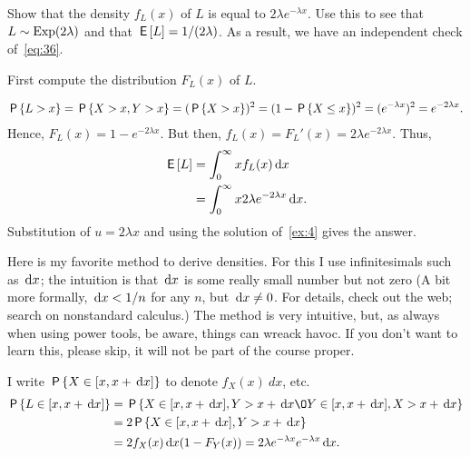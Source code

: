 \documentclass[a4paper,12pt]{article}
\begin{document}
\begin{exercise}
Show that the density $f_{L}(x)$ of $L$ is equal to $2\lambda e^{-\lambda x}$. Use this to see that $L\sim \mathrm{Exp}(2\lambda)$ and that $\,\mathsf{E}\left[L\right] = 1/(2\lambda)$. As a result, we have an independent check of~\cref{eq:36}.
\begin{hint}
  First compute the distribution $F_L(x)$ of $L$.
\end{hint}
\begin{solution}
  \begin{align}
    \label{eq:22}
\P{L>x}  = \P{X>x, Y> x} = (\P{X>x})^2 = (1-\P{X\leq x})^2= (e^{-\lambda x})^2 = e^{-2\lambda x}.
  \end{align}
Hence, $F_{L}(x) = 1-e^{-2 \lambda x}$. But then, $f_L(x) = F_L'(x) = 2 \lambda e^{-2\lambda x}$. Thus, 
  \begin{align}
\,\mathsf{E}\left[L\right]
&= \int_{0}^{\infty}  x f_{L}(x) \,\textrm{d}x  \\
&= \int_{0}^{\infty}  x 2 \lambda e^{-2\lambda x} \,\textrm{d}x.
  \end{align}
Substitution of $u=2\lambda x$ and using the solution of~\cref{ex:4} gives the answer.

Here is my favorite method to derive densities. For this I use infinitesimals such as $\,\textrm{d}x$; the intuition is that $\,\textrm{d}x$ is some really small number but not zero (A bit more formally, $\,\textrm{d}x < 1/n$ for any $n$, but $\,\textrm{d}x \neq 0$. For details, check out the web; search on nonstandard calculus.) The method is very intuitive, but, as always when using power tools, be aware, things can wreack havoc. If you don't want to learn this, please skip, it will not be part of the course proper.

I write $\,\mathsf{P}\left\{X\in [x, x+\,\textrm{d}x]\right\}$ to denote $f_{X}(x)\ dx$, etc. 
\begin{align}
  \label{eq:24}
\P{L\in [x, x+\d x]}  
&= \P{X \in[x, x+\d x], Y> x+\d x \O Y\in[x, x+\d x], X> x + \d x} \\
&= 2\P{X \in[x, x+\d x], Y> x+\d x} \\
&= 2 f_{X}(x) \d x (1-F_{Y}(x)) = 2 \lambda e^{-\lambda x} e^{-\lambda x} \d x.
\end{align}
\end{solution}
\end{exercise}
\end{document}
